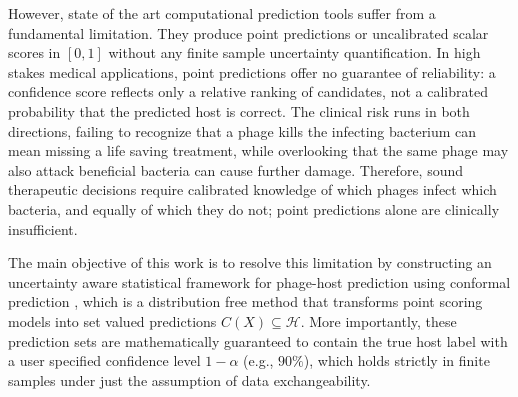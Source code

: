 However, state of the art computational prediction tools suffer from a fundamental limitation. They produce point 
predictions or uncalibrated scalar scores in $[0,1]$ without any finite sample uncertainty quantification. In high stakes 
medical applications, point predictions offer no guarantee of reliability: a confidence score reflects only a relative ranking of 
candidates, not a calibrated probability that the predicted host is correct. The clinical risk runs in both directions, failing to 
recognize that a phage kills the infecting bacterium can mean missing a life saving treatment, while overlooking that the same 
phage may also attack beneficial bacteria can cause further damage. Therefore, sound therapeutic decisions require calibrated 
knowledge of which phages infect which bacteria, and equally of which they do not; point predictions alone are clinically 
insufficient.


The main objective of this work is to resolve this limitation by constructing an uncertainty aware statistical framework 
for phage-host prediction using conformal prediction \cite{vovk2005algorithmic, angelopoulos2023conformal}, which is a 
distribution free method that transforms point scoring models into set valued predictions $C(X) \subseteq \mathcal{H}$. 
More importantly, these prediction sets are mathematically guaranteed to contain the true host label with a user specified 
confidence level $1-\alpha$ (e.g., $90\%$), which holds strictly in finite samples under just the assumption of data exchangeability.


